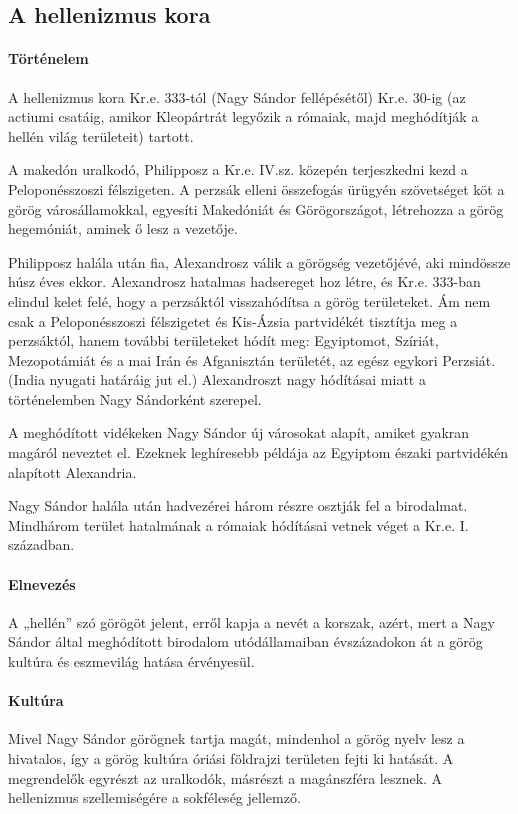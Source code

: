 \clearpage

\subsection*{A hellenizmus kora}

\paragraph{Történelem}
A hellenizmus kora Kr.e. 333-tól (Nagy Sándor fellépésétől) Kr.e. 30-ig (az actiumi csatáig, amikor Kleopártrát legyőzik a rómaiak, majd meghódítják a hellén világ területeit) tartott.

A makedón uralkodó, Philipposz a Kr.e. IV.sz. közepén terjeszkedni kezd a Peloponésszoszi félszigeten. A perzsák elleni összefogás ürügyén szövetséget köt a görög városállamokkal, egyesíti Makedóniát és Görögországot, létrehozza a görög hegemóniát, aminek ő lesz a vezetője.

Philipposz halála után fia, Alexandrosz válik a görögség vezetőjévé, aki mindössze húsz éves ekkor. Alexandrosz hatalmas hadsereget hoz létre, és Kr.e. 333-ban elindul kelet felé, hogy a perzsáktól visszahódítsa a görög területeket. Ám nem csak a Peloponésszoszi félszigetet és Kis-Ázsia partvidékét tisztítja meg a perzsáktól, hanem további területeket hódít meg: Egyiptomot, Szíriát, Mezopotámiát és a mai Irán és Afganisztán területét, az egész egykori Perzsiát. (India nyugati határáig jut el.) Alexandroszt nagy hódításai miatt a történelemben Nagy Sándorként szerepel.

A meghódított vidékeken Nagy Sándor új városokat alapít, amiket gyakran magáról neveztet el. Ezeknek leghíresebb példája az Egyiptom északi partvidékén alapított Alexandria.

Nagy Sándor halála után hadvezérei három részre osztják fel a birodalmat. Mindhárom terület hatalmának a rómaiak hódításai vetnek véget a Kr.e. I. században.

\paragraph{Elnevezés}
A „hellén” szó görögöt jelent, erről kapja a nevét a korszak, azért, mert a Nagy Sándor által meghódított birodalom utódállamaiban évszázadokon át a görög kultúra és eszmevilág hatása érvényesül.

\paragraph{Kultúra}
Mivel Nagy Sándor görögnek tartja magát, mindenhol a görög nyelv lesz a hivatalos, így a görög kultúra óriási földrajzi területen fejti ki hatását. A megrendelők egyrészt az uralkodók, másrészt a magánszféra lesznek. A hellenizmus szellemiségére a sokféleség jellemző.

